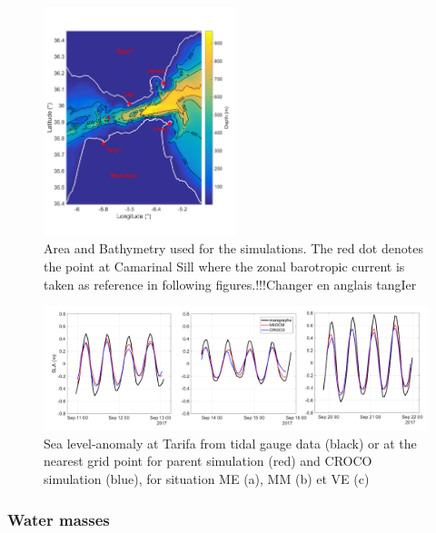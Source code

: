 \begin{figure}[!h]
        \includegraphics[width=0.5\textwidth]{./GBR3D/FigBathyVHR.png}
        \caption{Area and Bathymetry used for the simulations. The red dot denotes the point at Camarinal Sill where the zonal barotropic current is taken as reference in following figures.!!!Changer en anglais tangIer}
        \label{FigBathy3D}
\end{figure}



\begin{figure}[!h]
        \includegraphics[width=\textwidth]{./GBR3D/SLA_Tarifa_ME2VE2IES.png}
        \caption{Sea level-anomaly at Tarifa from tidal gauge data (black) or at the nearest grid point for parent simulation (red) and CROCO simulation (blue), for situation ME (a), MM (b) et VE (c)}
        \label{fig_maree_tar}
\end{figure}

\subsubsection{Water masses}


